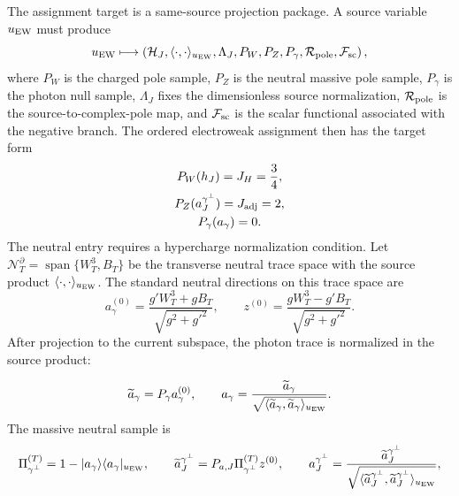 The assignment target is a same-source projection package.  A source variable
\(u_{\rm EW}\) must produce
\begin{equation}
  u_{\rm EW}\longmapsto
  \left(
  \mathcal H_J,\langle\cdot,\cdot\rangle_{u_{\rm EW}},
  \Lambda_J,P_W,P_Z,P_\gamma,\mathcal R_{\rm pole},
  \mathcal F_{\rm sc}
  \right),
  \label{eq:o1-same-source-package}
\end{equation}
where \(P_W\) is the charged pole sample, \(P_Z\) is the neutral massive pole
sample, \(P_\gamma\) is the photon null sample, \(\Lambda_J\) fixes the
dimensionless source normalization, \(\mathcal R_{\rm pole}\) is the
source-to-complex-pole map, and \(\mathcal F_{\rm sc}\) is the scalar
functional associated with the negative branch.  The ordered electroweak
assignment then has the target form
\begin{equation}
  \begin{gathered}
  P_W(h_J)=J_H=\frac34,\\
  P_Z(a_J^{\gamma^\perp})=J_{\rm adj}=2,\\
  P_\gamma(a_\gamma)=0.
  \end{gathered}
  \label{eq:o1-projector-targets}
\end{equation}
The neutral entry requires a hypercharge normalization condition.  Let
\(\mathcal N_T^\partial=\operatorname{span}\{W^3_T,B_T\}\) be the transverse
neutral trace space with the source product
\(\langle\cdot,\cdot\rangle_{u_{\rm EW}}\).  The standard neutral directions
on this trace space are
\begin{equation}
  a_\gamma^{(0)}
  =
  \frac{g'W^3_T+gB_T}{\sqrt{g^2+g'^2}},
  \qquad
  z^{(0)}
  =
  \frac{gW^3_T-g'B_T}{\sqrt{g^2+g'^2}} .
  \label{eq:tree-neutral-trace-directions}
\end{equation}
After projection to the current subspace, the photon trace is normalized in
the source product:
\begin{widetext}
\begin{equation}
  \widetilde a_\gamma=P_\gamma a_\gamma^{(0)},
  \qquad
  a_\gamma
  =
  \frac{\widetilde a_\gamma}
  {\sqrt{\langle\widetilde a_\gamma,\widetilde a_\gamma\rangle_{u_{\rm EW}}}} .
  \label{eq:source-normalized-photon-trace}
\end{equation}
The massive neutral sample is
\begin{equation}
  \Pi_{\gamma^\perp}^{(T)}
  =
  1-|a_\gamma\rangle\langle a_\gamma|_{u_{\rm EW}},
  \qquad
  \widetilde a_J^{\gamma^\perp}
  =
  P_{a,J}\Pi_{\gamma^\perp}^{(T)}z^{(0)},
  \qquad
  a_J^{\gamma^\perp}
  =
  \frac{\widetilde a_J^{\gamma^\perp}}
  {\sqrt{\langle\widetilde a_J^{\gamma^\perp},
  \widetilde a_J^{\gamma^\perp}\rangle_{u_{\rm EW}}}},
  \label{eq:neutral-gamma-perp-projector}
\end{equation}
\end{widetext}
